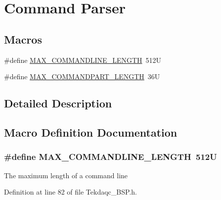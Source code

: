 \hypertarget{group__command__parser}{\section{Command Parser}
\label{group__command__parser}
}
\subsection*{Macros}
\begin{DoxyCompactItemize}
\item 
\#define \hyperlink{group__command__parser_gaab74dfff7eb006955f2aabec581f8d9f}{M\-A\-X\-\_\-\-C\-O\-M\-M\-A\-N\-D\-L\-I\-N\-E\-\_\-\-L\-E\-N\-G\-T\-H}~512\-U
\item 
\#define \hyperlink{group__command__parser_ga6147771b5547853f33eb838895e3d5a2}{M\-A\-X\-\_\-\-C\-O\-M\-M\-A\-N\-D\-P\-A\-R\-T\-\_\-\-L\-E\-N\-G\-T\-H}~36\-U
\end{DoxyCompactItemize}


\subsection{Detailed Description}


\subsection{Macro Definition Documentation}
\hypertarget{group__command__parser_gaab74dfff7eb006955f2aabec581f8d9f}{
\subsubsection[{M\-A\-X\-\_\-\-C\-O\-M\-M\-A\-N\-D\-L\-I\-N\-E\-\_\-\-L\-E\-N\-G\-T\-H}]{\setlength{\rightskip}{0pt plus 5cm}\#define M\-A\-X\-\_\-\-C\-O\-M\-M\-A\-N\-D\-L\-I\-N\-E\-\_\-\-L\-E\-N\-G\-T\-H~512\-U}}\label{group__command__parser_gaab74dfff7eb006955f2aabec581f8d9f}
The maximum length of a command line 

Definition at line 82 of file Tekdaqc\-\_\-\-B\-S\-P.\-h.


